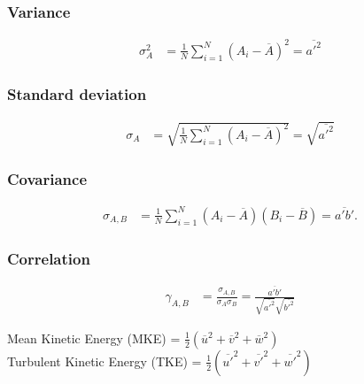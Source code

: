 \documentclass[fleqn,10pt]{SelfArx} %
\begin{document}
\subsubsection{Variance}
\begin{align*}
	\sigma_A^2 & = \frac{1}{N} \sum^N_{i=1}(A_i-\overline{A})^2 = \overline{a'^2}
\end{align*}

\subsubsection{Standard deviation}
\begin{align*}
	\sigma_A & = \sqrt{\frac{1}{N} \sum^N_{i=1}(A_i-\overline{A})^2} = \sqrt{\overline{a'^2}}
\end{align*}

\subsubsection{Covariance}
\begin{align*}
	\sigma_{A,B} & = \frac{1}{N} \sum_{i=1}^N (A_i - \overline{A})(B_i - \overline{B}) = \overline{a'b'}.
\end{align*}

\subsubsection{Correlation}
\begin{align*}
\gamma_{A,B} & = \frac{\sigma_{A,B}}{\sigma_A\sigma_B} = \frac{\overline{a'b'}}{\sqrt{\overline{a'^2}}\sqrt{\overline{b'^2}}}
\end{align*}

Mean Kinetic Energy (MKE) = $\frac{1}{2}(\overline{u}^2 + \overline{v}^2 +\overline{w}^2)$ \\
Turbulent Kinetic Energy (TKE) = $\frac{1}{2}(\overline{u'}^2 + \overline{v'}^2 +\overline{w'}^2)$
\end{document}
